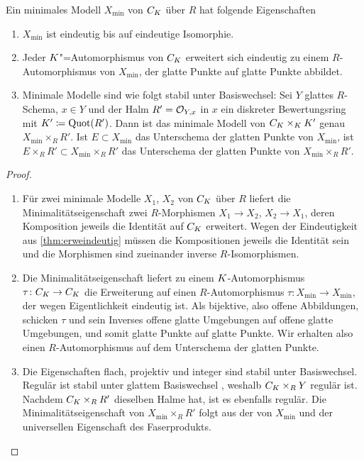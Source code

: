 \begin{Satz}\label{thm:eigminmodell}
  Ein minimales Modell $X_{\text{min}}$ von $C_{K}$ über $R$ hat
  folgende Eigenschaften
  \begin{enumerate}[label=(\roman*)]
  \item $X_{\text{min}}$ ist eindeutig bis auf eindeutige Isomorphie.
  \item{}
    Jeder $K$"=Automorphismus von $C_{K}$ erweitert sich eindeutig zu
    einem $R$-Automorphismus von $X_{\text{min}}$, der glatte Punkte
    auf glatte Punkte abbildet.
  \item{}
    Minimale Modelle sind wie folgt stabil unter Basiswechsel:
    Sei $Y$ glattes $R$-Schema, ${x\in Y}$ und der Halm $R'=\mathcal{O}_{Y,x}$ in
    $x$  ein diskreter Bewertungsring mit $K'\coloneqq\operatorname{Quot}(R')$.
    Dann ist das minimale Modell von $C_{K}\times_{K}K'$ genau
    $X_{\text{min}}\times_R R'$.
    Ist $E\subset X_{\text{min}}$ das Unterschema der glatten Punkte
    von $X_{\text{min}}$, ist
    $E\times_R R'\subset X_{\text{min}}\times_R R'$ das Unterschema
    der glatten Punkte von $X_{\text{min}}\times_R R'$.
  \end{enumerate}
  \begin{proof}
    \begin{enumerate}[label=(\roman*)]
    \item Für zwei minimale Modelle $X_1$, $X_2$ von $C_{K}$ über $R$
      liefert die Minimalitätseigenschaft zwei $R$-Morphismen
      $X_1\to X_2$, $X_2\to X_1$, deren Komposition jeweils die
      Identität auf $C_{K}$ erweitert. Wegen der Eindeutigkeit aus
      \ref{thm:erweindeutig} müssen die Kompositionen jeweils die
      Identität sein und die Morphismen sind zueinander inverse
      $R$-Isomorphismen.
    \item Die Minimalitätseigenschaft liefert zu einem
      $K$-Automorphismus $\tau\colon C_{K}\to C_{K}$ die Erweiterung auf
      einen $R$-Automorphismus
      $\tau\colon X_{\text{min}}\to X_{\text{min}}$, der wegen
      Eigentlichkeit eindeutig ist.
      Als bijektive, also offene Abbildungen, schicken $\tau$ und
      sein Inverses offene glatte Umgebungen auf offene glatte
      Umgebungen, und somit glatte Punkte auf glatte Punkte. Wir
      erhalten also einen $R$-Automorphismus auf dem Unterschema der
      glatten Punkte.
    \item Die Eigenschaften flach, projektiv und integer sind stabil
      unter Basiswechsel. Regulär ist stabil unter glattem
      Basiswechsel \cite[Chapter 2.3, Page 49]{neron}, weshalb
      $C_{K}\times_R Y$ regulär ist.
      Nachdem $C_{K}\times_R R'$ dieselben Halme hat, ist es ebenfalls
      regulär.
      Die Minimalitätseigenschaft von $X_{\text{min}}\times_R R'$
      folgt aus der von $X_{\text{min}}$ und der universellen
      Eigenschaft des Faserprodukts.
      

\end{enumerate}
\end{proof}
\end{Satz}
